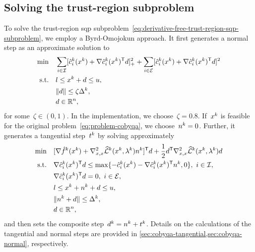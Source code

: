 \subsection{Solving the trust-region  subproblem}
\label{subsec:solving-trust-region-subproblem}

To solve the trust-region \gls{sqp} subproblem~\cref{eq:derivative-free-trust-region-sqp-subproblem}, we employ a Byrd-Omojokun approach.
It first generates a normal step as an approximate solution to
\begin{subequations}
    \label{eq:cobyqa-normal}
    \begin{align}
        \min        & \quad \sum_{i \in \iub} \posp{\conm[k]{i}(\iter[k]) + \nabla \conm[k]{i}(\iter[k])^{\T} \step}^2 + \sum_{i \in \ieq} [\conm[k]{i}(\iter[k]) + \nabla \conm[k]{i}(\iter[k])^{\T} \step]^2\\
        \text{s.t.} & \quad \xl \le \iter[k] + \step \le \xu,\\
                    & \quad \norm{\step} \le \zeta \rad[k], \label{eq:cobyqa-normal-tr}\\
                    & \quad \step \in \R^n, \nonumber
    \end{align}
\end{subequations}
for some~$\zeta \in (0, 1)$.
In the implementation, we choose~$\zeta = 0.8$.
If~$\iter[k]$ is feasible for the original problem~\cref{eq:problem-cobyqa}, we choose~$\nstep[k] = 0$.
Further, it generates a tangential step~$\tstep[k]$ by solving approximately
\begin{subequations}
    \label{eq:cobyqa-tangential-original}
    \begin{align}
        \min        & \quad [\nabla \objm[k](\iter[k]) + \nabla_{x, x}^2 \lagm[k](\iter[k], \lm[k]) \nstep[k]]^{\T} \step + \frac{1}{2} \step^{\T} \nabla_{x, x}^2 \lagm[k](\iter[k], \lm[k]) \step\\
        \text{s.t.} & \quad \nabla \conm[k]{i}(\iter[k])^{\T} \step \le \max \set{-\conm[k]{i}(\iter[k]) - \nabla \conm[k]{i}(\iter[k])^{\T} \nstep[k], 0}, ~ i \in \iub,\\
                    & \quad \nabla \conm[k]{i}(\iter[k])^{\T} \step = 0, ~ i \in \ieq,\\
                    & \quad \xl \le \iter[k] + \nstep[k] + \step \le \xu,\\
                    & \quad \norm{\nstep[k] + \step} \le \rad[k],\\
                    & \quad \step \in \R^n, \nonumber
    \end{align}
\end{subequations}
and then sets the composite step~$\step[k] = \nstep[k] + \tstep[k]$.
Details on the calculations of the tangential and normal steps are provided in \cref{sec:cobyqa-tangential,sec:cobyqa-normal}, respectively.

